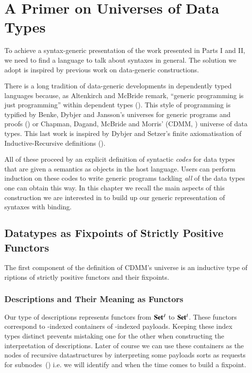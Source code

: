 \chapter{A Primer on Universes of Data Types}\label{section:data}

To achieve a syntax-generic presentation of the work presented in Parts I
and II, we need to find a language to talk about syntaxes in general.
The solution we adopt is inspired by previous work on data-generic
constructions.

There is a long tradition of data-generic developments in dependently typed
languages because, as  Altenkirch and McBride remark,
``generic programming is just programming'' within dependent types
(\citeyear{DBLP:conf/ifip2-1/AltenkirchM02}).
%
This style of programming is typified by Benke, Dybjer and Jansson's
universes for generic programs and proofs (\citeyear{benke-ugpp}) or
Chapman, Dagand, McBride and Morris'
(CDMM, \citeyear{Chapman:2010:GAL:1863543.1863547})
universe of data types.
%
This last work is inspired by Dybjer and Setzer's
finite axiomatisation of Inductive-Recursive definitions
(\citeyear{Dybjer1999}).


%
All of these proceed by an explicit definition of syntactic \emph{codes}
for data types that are given a semantics as objects in the host language.
Users can perform induction on these codes to write generic programs
tackling \emph{all} of the data types one can obtain this way.
%
In this chapter we recall the main aspects of this construction we are
interested in to build up our generic representation of syntaxes with binding.

\section{Datatypes as Fixpoints of Strictly Positive Functors}

The first component of the definition of CDMM's universe is an inductive
type of riptions of strictly positive functors and their
fixpoints.

\subsection{Descriptions and Their Meaning as Functors}
\label{fig:datades}
\label{fig:datadescmeaning}

Our type of descriptions represents functors from ${\mathbf{Set}}{}^J$ to ${\mathbf{Set}}{}^I$.
These functors correspond to -indexed containers of -indexed
payloads. Keeping these index types distinct prevents mistaking one for the
other when constructing the interpretation of descriptions. Later of course
we can use these containers as the nodes of recursive datastructures by
interpreting some payloads sorts as requests for
subnodes~(\cite{DBLP:journals/jfp/AltenkirchGHMM15}) i.e. we will identify
 and  when the time comes to build a fixpoint.


